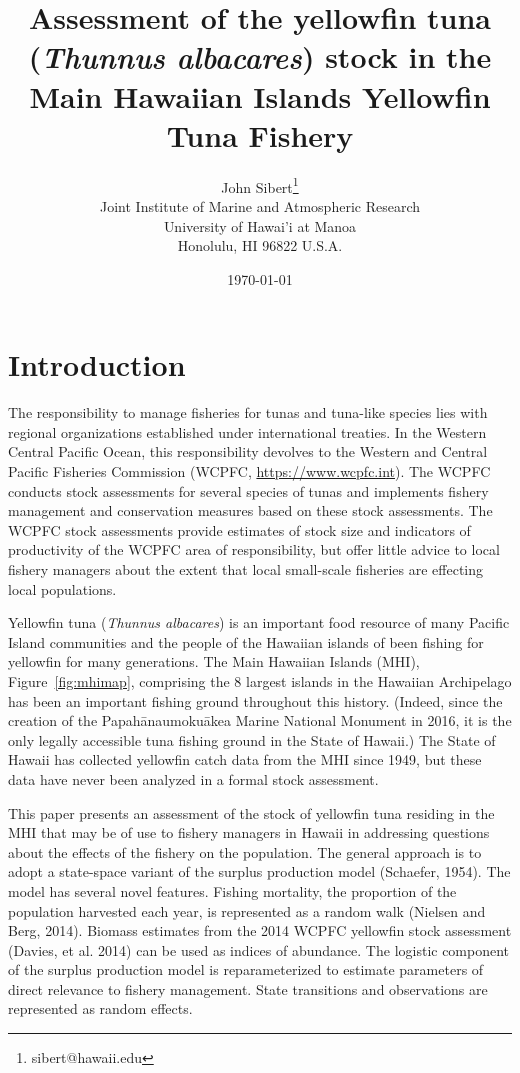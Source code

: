 \documentclass[12pt,letterpaper]{article}
\title{Assessment of the yellowfin tuna ({\it Thunnus albacares}) 
stock in the Main Hawaiian Islands Yellowfin Tuna Fishery}
\author{
John Sibert\thanks{sibert@hawaii.edu}\\
Joint Institute of Marine and Atmospheric Research\\
University of Hawai'i at Manoa\\
Honolulu, HI  96822 U.S.A.\\[0.125in]
\date{\today}
}
\newcommand\doublespacing{\baselineskip=1.6\normalbaselineskip}
\newcommand\help[1]{\color{Magenta}{\it #1}\normalcolor}
\begin{document}
\maketitle

\doublespacing

\begin{abstract}
\begin{center}\help{Write me!}\end{center}
\end{abstract}


\section*{Introduction}
The responsibility to manage fisheries for tunas and tuna-like species
lies with regional organizations established under international treaties.
In the Western Central Pacific Ocean, this responsibility devolves to
the Western and Central Pacific Fisheries Commission (WCPFC, 
\url{https://www.wcpfc.int}).
The WCPFC conducts stock assessments for several species of tunas and
implements fishery management and conservation measures based on
these stock assessments. The WCPFC stock assessments provide estimates
of stock size and indicators of productivity of the WCPFC area of
responsibility, but offer little advice to local fishery managers about
the extent that local small-scale fisheries are effecting local
populations.

Yellowfin tuna ({\it Thunnus albacares}) is an important food resource
of many Pacific Island communities and the people of the Hawaiian
islands of been fishing for yellowfin for many generations. 
The Main Hawaiian Islands (MHI), Figure~\ref{fig:mhimap},
comprising the 8 largest islands in the Hawaiian Archipelago
has been an important fishing ground throughout this history.
(Indeed, since the creation of the Papah\={a}naumoku\={a}kea Marine National
Monument in 2016, it is the only legally accessible tuna fishing ground
in the State of Hawaii.)
The State of Hawaii has collected yellowfin catch data from the MHI
since 1949, but these data have never been analyzed in a formal stock
assessment.

This paper presents an assessment of the stock of yellowfin tuna
residing in the MHI that may be of use to fishery managers in Hawaii
in addressing questions about the effects of the fishery on the
population. The general approach is to adopt a state-space variant of
the surplus production model  (Schaefer, 1954). 
The model has several novel features.
Fishing mortality, the proportion of the population harvested each
year, is represented as a random walk (Nielsen and Berg, 2014).
Biomass estimates from the 2014 WCPFC yellowfin stock assessment
(Davies, et al. 2014) can be used as indices of abundance.
The logistic component of the surplus production model is
reparameterized to estimate parameters of direct relevance to fishery
management. State transitions and observations are represented as
random effects.
\end{document}
